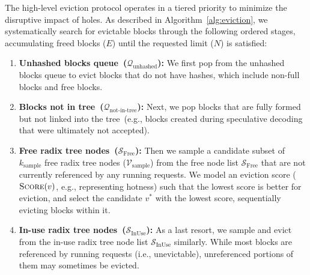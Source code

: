 \documentclass[letterpaper,twocolumn,10pt]{article}
\begin{document}
The high-level eviction protocol operates in a tiered priority to minimize the
disruptive impact of holes. As described in Algorithm~\ref{alg:eviction}, we
systematically search for evictable blocks through the following ordered stages, 
accumulating freed blocks ($E$) until the requested limit ($N$) is satisfied:
\begin{enumerate}
    \item \textbf{Unhashed blocks queue~($\mathcal{Q}_{\text{unhashed}}$):}
    We first pop from the unhashed blocks queue to evict blocks that do not
    have hashes, which include non-full blocks and free blocks.
    \item \textbf{Blocks not in tree~($\mathcal{Q}_{\text{not-in-tree}}$):}
    Next, we pop blocks that are fully formed but not linked into the
    tree~(e.g., blocks created during speculative decoding that were ultimately
    not accepted).
    \item \textbf{Free radix tree nodes~($\mathcal{S}_{\text{Free}}$):}
    Then we sample a candidate subset of $k_{\text{sample}}$ free radix tree
    nodes ($\mathcal{V}_{\text{sample}}$) from the free node list
    $\mathcal{S}_{\text{Free}}$ that are not currently referenced by any
    running requests. We model an eviction score ($\Call{Score}{v}$, e.g.,
    representing hotness) such that the lowest score is better for eviction,
    and select the candidate $v^*$ with the lowest score, sequentially
    evicting blocks within it.
    \item \textbf{In-use radix tree nodes~($\mathcal{S}_{\text{InUse}}$):}
    As a last resort, we sample and evict from the in-use radix tree node list
    $\mathcal{S}_{\text{InUse}}$ similarly. While most blocks are referenced
    by running requests (i.e., unevictable), unreferenced portions of them may
    sometimes be evicted.
\end{enumerate}
\end{document}
